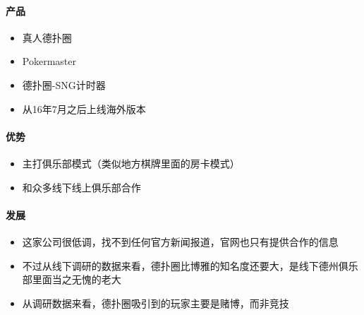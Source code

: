 \documentclass[11pt]{article}
\providecommand{\tightlist}{%
      \setlength{\itemsep}{0pt}\setlength{\parskip}{0pt}}
\begin{document}
\hypertarget{ux4ea7ux54c1}{%
\paragraph{产品}\label{ux4ea7ux54c1}}

\begin{itemize}
\tightlist
\item
  真人德扑圈
\item
  Pokermaster
\item
  德扑圈-SNG计时器
\item
  从16年7月之后上线海外版本
\end{itemize}

\hypertarget{ux4f18ux52bf}{%
\paragraph{优势}\label{ux4f18ux52bf}}

\begin{itemize}
\tightlist
\item
  主打俱乐部模式（类似地方棋牌里面的房卡模式）
\item
  和众多线下线上俱乐部合作
\end{itemize}

\hypertarget{ux53d1ux5c55}{%
\paragraph{发展}\label{ux53d1ux5c55}}

\begin{itemize}
\tightlist
\item
  这家公司很低调，找不到任何官方新闻报道，官网也只有提供合作的信息
\item
  不过从线下调研的数据来看，德扑圈比博雅的知名度还要大，是线下德州俱乐部里面当之无愧的老大
\item
  从调研数据来看，德扑圈吸引到的玩家主要是赌博，而非竞技
\end{itemize}


    
    
    
    
\end{document}
